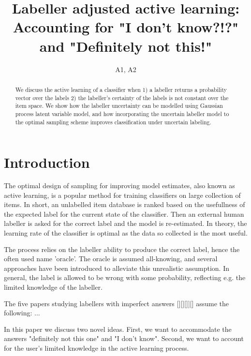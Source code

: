 \documentclass[10pt, onecolumn]{article}
\begin{document}
\title{Labeller adjusted active learning: Accounting for "I
  don't know?!?" and "Definitely not this!"}
\author{A1, A2}
\maketitle


\begin{abstract}
We discuss the active learning of a classifier when 1) a labeller
returns a probability vector over the labels 2) the labeller's
certainty of the labels is not constant over the item space. We show
how the labeller uncertainty can be modelled using Gaussian process
latent variable model, and how incorporating the uncertain labeller
model to the optimal sampling scheme improves classification under
uncertain labeling.
\end{abstract}


\section{Introduction}

The optimal design of sampling for improving model estimates, also
known as active learning, is a popular method for training classifiers
on large collection of items. In short, an unlabelled item database is
ranked based on the usefullness of the expected label for the current
state of the classifier. Then an external human labeller is asked for
the correct label and the model is re-estimated. In theory, the
learning rate of the classifier is optimal as the data so collected is
the most useful. 

The process relies on the labeller ability to produce the correct
label, hence the often used name 'oracle'. The oracle is assumed
all-knowing, and several approaches have been introduced to alleviate
this unrealistic assumption. In general, the label is allowed to be
wrong with some probability, reflecting e.g. the limited knowledge of
the labeller.

The five papers studying labellers with imperfect answers [][][]][]
assume the following: ... 


In this paper we discuss two novel ideas. First, we want to
accommodate the answers "definitely not this one" and "I don't
know". Second, we want to account for the user's limited knowledge in
the active learning process. 
\end{document}
